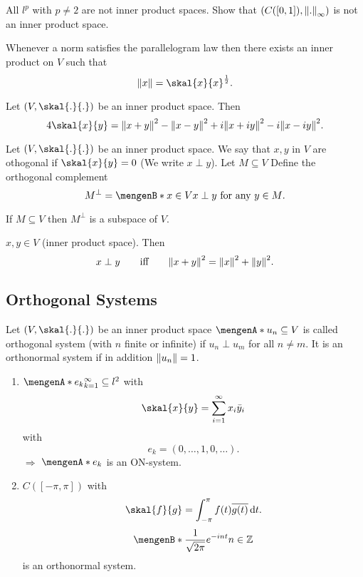All $l^p$ with $p \neq 2$ are not inner product spaces. 
Show that $(C([0,1]),\norm{.}_{\infty})$ is not an inner product space.
\begin{bemerkung}
	Whenever a norm satisfies the parallelogram law then there exists an inner product on $V$ such that
	\[
		\norm{x} = \skal{x}{x}^{\frac{1}{2}}.
	\]
\end{bemerkung}
\begin{theorem}
	Let $(V,\skal{.}{.})$ be an inner product space. Then 
	\[
		4 \skal{x}{y}  = \norm{x+y}^2- \norm{x-y}^2 + i \norm{x+ iy}^2 - i \norm{x - iy}^2.
	\]
\end{theorem}
\begin{definition}
	Let $(V, \skal{.}{.})$ be an inner product space. We say that $x,y$ in $V$ are othogonal if $\skal{x}{y} = 0$ (We write $x \perp y$). Let $M \subseteq V$
	Define the orthogonal complement
	\[
		M^{\perp} = \set[x \in V]{x \perp y \text{ for any }y \in M}.
	\]
\end{definition}
\begin{proposition}
	If $M \subseteq V$ then $M^{\perp}$ is a subspace of $V$.
\end{proposition}
\begin{theorem}
	$x,y \in V$ (inner product space). Then
	\[
		x \perp y \qquad \text{iff} \qquad \norm{x+y}^2 = \norm{x}^2 + \norm{y}^2.
	\]
\end{theorem}

\subsection{Orthogonal Systems} 
\label{sub:orthogonal_systems}

Let $(V, \skal{.}{.})$ be an inner product space $\set{u_n} \subseteq V$ is called orthogonal system (with $n$ finite or infinite) if $u_n \perp u_m$ for all $n \neq m$. It is an orthonormal system if in addition $\norm{u_n}=1$. 

\begin{beispiele}
	\begin{enumerate}[1)]
		\item $\set{e_k}_{k=1}^{\infty} \subseteq l^2$ with 
		\[
			\skal{x}{y} = \sum^{\infty}_{i=1} x_i \bar{y}_i
		\]
		with 
		\[
			e_k = (0,\dots,1,0,\dots).
		\]
		$\Rightarrow$ $\set{e_k}$ is an ON-system. 
		\item $C([-\pi,\pi])$ with
		\[
			\skal{f}{g} = \int_{- \pi}^{\pi} f(t) \overline{g(t)} \,\mathrm{d}t.
		\]
		\[
			\set[\frac{1}{\sqrt{2 \pi}} e^{-int}]{n \in \mathbb{Z}}
		\]
		is an orthonormal system.
	\end{enumerate}
\end{beispiele}

